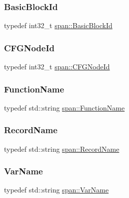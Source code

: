 \subsubsection{\texorpdfstring{Basic\+Block\+Id}{BasicBlockId}}
{\footnotesize\ttfamily typedef int32\+\_\+t \hyperlink{namespacespan_ab988dafbd25ab39838239b91d6a86214}{span\+::\+Basic\+Block\+Id}}

\mbox{\label{namespacespan_a34e8d849ca2007fe03cb1817685d08bf}} 
\subsubsection{\texorpdfstring{C\+F\+G\+Node\+Id}{CFGNodeId}}
{\footnotesize\ttfamily typedef int32\+\_\+t \hyperlink{namespacespan_a34e8d849ca2007fe03cb1817685d08bf}{span\+::\+C\+F\+G\+Node\+Id}}

\mbox{\label{namespacespan_a5184c08609df37077d47e497f83aadd1}} 
\subsubsection{\texorpdfstring{Function\+Name}{FunctionName}}
{\footnotesize\ttfamily typedef std\+::string \hyperlink{namespacespan_a5184c08609df37077d47e497f83aadd1}{span\+::\+Function\+Name}}

\mbox{\label{namespacespan_a556ddaab2ad6c39fb1d89fb38182fe57}} 
\subsubsection{\texorpdfstring{Record\+Name}{RecordName}}
{\footnotesize\ttfamily typedef std\+::string \hyperlink{namespacespan_a556ddaab2ad6c39fb1d89fb38182fe57}{span\+::\+Record\+Name}}

\mbox{\label{namespacespan_adc1e351442e4f323d37dbbb8736d003f}} 
\subsubsection{\texorpdfstring{Var\+Name}{VarName}}
{\footnotesize\ttfamily typedef std\+::string \hyperlink{namespacespan_adc1e351442e4f323d37dbbb8736d003f}{span\+::\+Var\+Name}}

